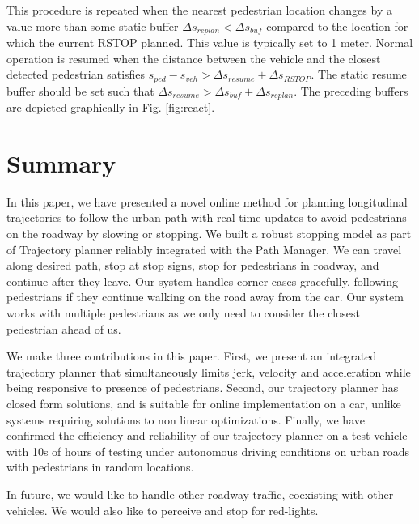 \documentclass[letterpaper, 10 pt, conference]{ieeeconf}  %
\begin{document}
This procedure is repeated when the nearest pedestrian location changes by a value more than some static buffer $\Delta s_{replan} < \Delta s_{buf}$ compared to the location for which the current RSTOP planned.
This value is typically set to 1 meter.
Normal operation is resumed when the distance between the vehicle and the closest detected pedestrian satisfies $s_{ped} - s_{veh} > \Delta s_{resume} + \Delta s_{RSTOP}$. The static resume buffer should be set such that $\Delta s_{resume} > \Delta s_{buf} + \Delta s_{replan}$.
The preceding buffers are depicted graphically in Fig. \ref{fig:react}.

\section{Summary} \label{sec:summary}

In this paper, we have presented a novel online method for planning longitudinal trajectories 
to follow the urban path with real time updates to avoid pedestrians on the roadway by slowing or 
stopping. We built a robust stopping model as part of Trajectory planner reliably integrated with 
the Path Manager.
We can travel along desired path, stop at stop signs, stop for pedestrians in roadway, and continue after 
they leave. Our system handles corner cases gracefully, following pedestrians if they continue walking 
on the road away from the car. Our system works with multiple pedestrians as we only 
need to consider the closest pedestrian ahead of us. 

We make three contributions in this paper. First, we present an integrated trajectory planner that
simultaneously limits jerk, velocity and acceleration while being responsive to presence of pedestrians.
Second, our trajectory planner has closed form solutions, and is suitable for online implementation
on a car, unlike systems requiring solutions to non linear optimizations. Finally, we have confirmed the
efficiency and reliability of our trajectory planner on a test vehicle with 10s of hours of testing
under autonomous driving conditions on urban roads with pedestrians in random locations. 

In future, we would like to handle other roadway traffic, 
coexisting with other vehicles. We would also like to perceive and stop for red-lights.





\end{document}
